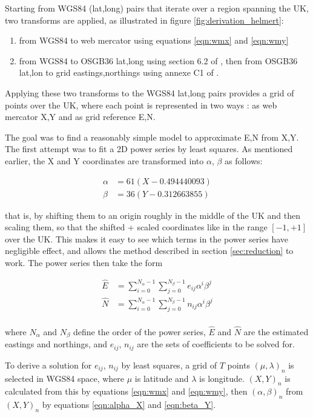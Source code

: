\documentclass[10pt,a4paper]{article}
\begin{document}
Starting from WGS84 (lat,long) pairs that iterate over a region spanning the
UK, two transforms are applied, as illustrated in figure
\ref{fig:derivation_helmert}:

\begin{enumerate}
  \item from WGS84 to web mercator using equations \eqref{eqn:wmx} and \eqref{eqn:wmy}
  \item from WGS84 to OSGB36 lat,long using section 6.2 of \cite{gcs}, then
    from OSGB36 lat,lon to grid eastings,northings using annexe C1 of \cite{gcs}.
\end{enumerate}

Applying these two transforms to the WGS84 lat,long pairs provides a grid of
points over the UK, where each point is represented in two ways : as web
mercator X,Y and as grid reference E,N.

The goal was to find a reasonably simple model to approximate E,N from X,Y.
The first attempt was to fit a 2D power series by least squares.   As mentioned
earlier, the X and Y coordinates are transformed into $\alpha$, $\beta$ as
follows:

\begin{align}
  \alpha &= 61 (X-0.494440093) \label{eqn:alpha_X} \\
  \beta  &= 36 (Y-0.312663855) \label{eqn:beta_Y}
\end{align}

that is, by shifting them to an origin roughly in the middle of the UK and then
scaling them, so that the shifted + scaled coordinates like in the range
$[-1,+1]$ over the UK.  This makes it easy to see which terms in the power
series have negligible effect, and allows the method described in section
\ref{sec:reduction} to work.  The power series then take the form

\begin{align}
\hat{E} &= \sum_{i=0}^{N_\alpha - 1} \sum_{j=0}^{N_\beta - 1} e_{ij}\alpha^i\beta^j \\
\hat{N} &= \sum_{i=0}^{N_\alpha - 1} \sum_{j=0}^{N_\beta - 1} n_{ij}\alpha^i\beta^j \\
\end{align}

where $N_\alpha$ and $N_\beta$ define the order of the power series, $\hat{E}$
and $\hat{N}$ are the estimated eastings and northings, and $e_{ij}$, $n_{ij}$
are the sets of coefficients to be solved for.

To derive a solution for $e_{ij}$, $n_{ij}$ by least squares, a grid of $T$ points
$(\mu,\lambda)_n$ is selected in WGS84 space, where $\mu$ is latitude and
$\lambda$ is longitude.  $(X,Y)_n$ is calculated from this by equations
\eqref{eqn:wmx} and \eqref{eqn:wmy}, then $(\alpha,\beta)_n$ from $(X,Y)_n$ by
equations \eqref{eqn:alpha_X} and \eqref{eqn:beta_Y}.
\end{document}
